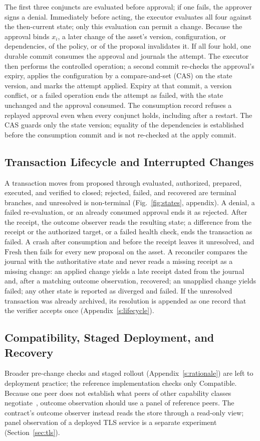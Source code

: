 \documentclass[journal]{IEEEtran}
\newcommand{\Fresh}{\mathrm{Fresh}}
\newcommand{\Compatible}{\mathrm{Compatible}}
\begin{document}
The first three conjuncts are evaluated before approval; if one fails, the approver signs a denial. Immediately before acting, the executor evaluates all four against the then-current state; only this evaluation can permit a change. Because the approval binds $x_i$, a later change of the asset's version, configuration, or dependencies, of the policy, or of the proposal invalidates it. If all four hold, one durable commit consumes the approval and journals the attempt. The executor then performs the controlled operation; a second commit re-checks the approval's expiry, applies the configuration by a compare-and-set (CAS) on the state version, and marks the attempt applied. Expiry at that commit, a version conflict, or a failed operation ends the attempt as failed, with the state unchanged and the approval consumed. The consumption record refuses a replayed approval even when every conjunct holds, including after a restart. The CAS guards only the state version; equality of the dependencies is established before the consumption commit and is not re-checked at the apply commit.

\subsection{Transaction Lifecycle and Interrupted Changes}
\label{sec:lifecycle}
A transaction moves from proposed through evaluated, authorized, prepared, executed, and verified to closed; rejected, failed, and recovered are terminal branches, and unresolved is non-terminal (Fig.~\ref{fig:states}, appendix). A denial, a failed re-evaluation, or an already consumed approval ends it as rejected. After the receipt, the outcome observer reads the resulting state; a difference from the receipt or the authorized target, or a failed health check, ends the transaction as failed. A crash after consumption and before the receipt leaves it unresolved, and $\Fresh$ then fails for every new proposal on the asset. A reconciler compares the journal with the authoritative state and never reads a missing receipt as a missing change: an applied change yields a late receipt dated from the journal and, after a matching outcome observation, recovered; an unapplied change yields failed; any other state is reported as diverged and failed. If the unresolved transaction was already archived, its resolution is appended as one record that the verifier accepts once (Appendix~\ref{s:lifecycle}).

\subsection{Compatibility, Staged Deployment, and Recovery}
\label{sec:recovery}
Broader pre-change checks and staged rollout (Appendix~\ref{s:rationale}) are left to deployment practice; the reference implementation checks only $\Compatible$. Because one peer does not establish what peers of other capability classes negotiate~\cite{han}, outcome observation should use a panel of reference peers. The contract's outcome observer instead reads the store through a read-only view; panel observation of a deployed TLS service is a separate experiment (Section~\ref{sec:tls}).
\end{document}

